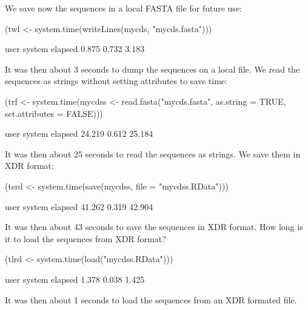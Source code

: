 \documentclass{article}
\begin{document}
We save now the sequences in a local FASTA file for future use:

\begin{Schunk}
\begin{Sinput}
 (twl <- system.time(writeLines(mycds, "mycds.fasta")))
\end{Sinput}
\begin{Soutput}
   user  system elapsed 
  0.875   0.732   3.183 
\end{Soutput}
\end{Schunk}

It was then about 3 seconds
to dump the sequences on a local file. We read the sequences as strings
without setting attributes to save time:

\begin{Schunk}
\begin{Sinput}
 (trf <- system.time(mycdss <- read.fasta("mycds.fasta", as.string = TRUE, 
     set.attributes = FALSE)))
\end{Sinput}
\begin{Soutput}
   user  system elapsed 
 24.219   0.612  25.184 
\end{Soutput}
\end{Schunk}

It was then about 25 seconds
to read the sequences as strings. We save them in XDR format:

\begin{Schunk}
\begin{Sinput}
 (tsrd <- system.time(save(mycdss, file = "mycdss.RData")))
\end{Sinput}
\begin{Soutput}
   user  system elapsed 
 41.262   0.319  42.904 
\end{Soutput}
\end{Schunk}

It was then about 43 seconds
to save the sequences in XDR format. How long is it to load the sequences
from XDR format?

\begin{Schunk}
\begin{Sinput}
 (tlrd <- system.time(load("mycdss.RData")))
\end{Sinput}
\begin{Soutput}
   user  system elapsed 
  1.378   0.038   1.425 
\end{Soutput}
\end{Schunk}

It was then about 1 seconds
to load the sequences from an XDR formated file. 
\end{document}
